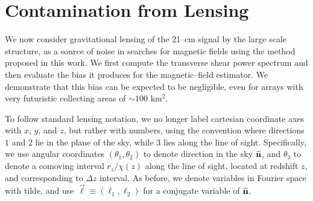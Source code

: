 \section{Contamination from Lensing}

We now consider gravitational lensing of the 21--cm signal by the large scale structure, as a source of noise in searches for magnetic fields using the method proposed in this work. We first compute the transverse shear power spectrum and then evaluate the bias it produces for the magnetic--field estimator. We demonstrate that this bias can be expected to be negligible, even for arrays with very futuristic collecting areas of $\sim 100$ km$^2$.

To follow standard lensing notation, we no longer label cartesian coordinate axes with $x$, $y$, and $z$, but rather with numbers, using the convention where directions $1$ and $2$ lie in the plane of the sky, while $3$ lies along the line of sight. Specifically, we use angular coordinates $(\theta_1, \theta_2)$ to denote direction in the sky ${\bf{\widehat n}}$, and $\theta_3$ to denote a comoving interval $r_z/\chi(z)$ along the line of sight, located at redshift $z$, and corresponding to $\Delta z$ interval. As before, we denote variables in Fourier space with tilde, and use $\vec{\ell}\equiv(\ell_1,\ell_2)$ for a conjugate variable of ${\bf{\widehat n}}$. 
 
